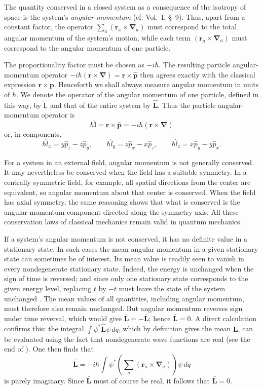 The quantity conserved in a closed system as a consequence of the isotropy
of space is the system's \emph{angular momentum} (cf. Vol.~I, \S~9). Thus,
apart from a constant factor, the operator
$\sum_a(\mathbf r_a\times\boldsymbol\nabla_a)$ must correspond to the total angular
momentum of the system's motion, while each term
$(\mathbf r_a\times\boldsymbol\nabla_a)$ must correspond to the angular momentum of
one particle.

The proportionality factor must be chosen as $-i\hbar$. The resulting
particle angular-momentum operator
$-i\hbar(\mathbf r\times\boldsymbol\nabla)=
\mathbf r\times\hat{\mathbf p}$ then agrees
exactly with the classical expression $\mathbf r\times\mathbf p$. Henceforth we
shall always measure angular momentum in units of $\hbar$. We denote the
operator of the angular momentum of one particle, defined in this way, by
$\hat{\mathbf l}$, and that of the entire system by $\hat{\mathbf L}$. Thus
the particle angular-momentum operator is
\begin{equation}
  \hbar\hat{\mathbf l}=\mathbf r\times\hat{\mathbf p}
  =-i\hbar(\mathbf r\times\boldsymbol\nabla)
  \tag{26.2}
\end{equation}
or, in components,
\[
  \hbar\hat l_x=y\hat p_z-z\hat p_y,\qquad
  \hbar\hat l_y=z\hat p_x-x\hat p_z,\qquad
  \hbar\hat l_z=x\hat p_y-y\hat p_x.
\]

For a system in an external field, angular momentum is not generally
conserved. It may nevertheless be conserved when the field has a suitable
symmetry. In a centrally symmetric field, for example, all spatial directions
from the center are equivalent, so angular momentum about that center is
conserved. When the field has axial symmetry, the same reasoning shows that
what is conserved is the angular-momentum component directed along the symmetry
axis. All these conservation laws of
classical mechanics remain valid in quantum mechanics.

If a system's angular momentum is not conserved, it has no definite value in
a stationary state. In such cases the mean angular momentum in a given
stationary state can sometimes be of interest. Its mean value is readily seen
to vanish in every nondegenerate stationary state. Indeed, the energy is
unchanged when the sign of time is reversed; and since only one stationary
state corresponds to the given energy level, replacing $t$ by $-t$ must leave
the state of the system unchanged%
\relax. The mean values of all quantities, including angular momentum, must
therefore also remain unchanged. But angular momentum reverses sign under
time reversal, which would give
$\bar{\mathbf L}=-\bar{\mathbf L}$; hence $\bar{\mathbf L}=0$. A direct
calculation confirms this: the integral
$\int\psi^*\hat{\mathbf L}\psi\,dq$, which by definition gives the mean
$\bar{\mathbf L}$, can be evaluated using the fact that nondegenerate wave
functions are real (see the end of ). One then finds that
\[
  \bar{\mathbf L}=-i\hbar\int\psi^*
  \left(\sum_a(\mathbf r_a\times\boldsymbol\nabla_a)\right)\psi\,dq
\]
is purely imaginary. Since $\bar{\mathbf L}$ must of course be real, it follows
that $\bar{\mathbf L}=0$.

